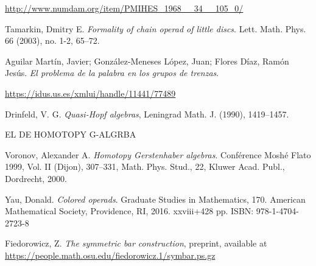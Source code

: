 \documentclass[TFM.tex]{subfiles}
\begin{document}
\begin{thebibliography}{}
 \url{http://www.numdam.org/item/PMIHES_1968__34__105_0/} %


 Tamarkin, Dmitry E. \emph{Formality of chain operad of little discs}. Lett. Math. Phys. 66 (2003), no. 1-2, 65–72. 


 Aguilar Martín, Javier; González-Meneses López, Juan; Flores Díaz, Ramón Jesús. \emph{El problema de la palabra en los grupos de trenzas}.

 \url{https://idus.us.es/xmlui/handle/11441/77489}
 

 
 Drinfeld, V. G. \emph{Quasi-Hopf algebras}, Leningrad Math. J. (1990), 1419–1457.

 EL DE HOMOTOPY G-ALGRBA

 Voronov, Alexander A. \emph{Homotopy Gerstenhaber algebras}. Conférence Moshé Flato 1999, Vol. II (Dijon), 307–331, Math. Phys. Stud., 22, Kluwer Acad. Publ., Dordrecht, 2000.


 Yau, Donald. \emph{Colored operads}. Graduate Studies in Mathematics, 170. American Mathematical Society, Providence, RI, 2016. xxviii+428 pp. ISBN: 978-1-4704-2723-8


 Fiedorowicz, Z. \emph{The symmetric bar construction}, preprint, available at \url{https://people.math.osu.edu/fiedorowicz.1/symbar.ps.gz}









\end{thebibliography}
\end{document}
